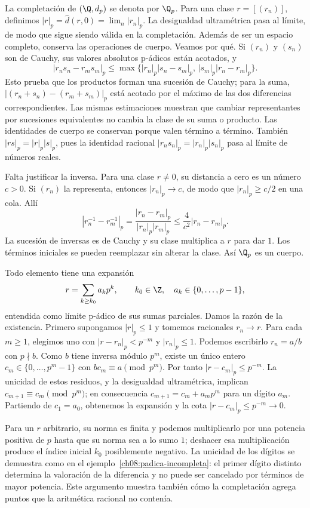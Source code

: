 \begin{ejemplo}\label{ch09:qp}
La completación de $(\Q,d_p)$ se denota por $\Q_p$. Para una clase $r=[(r_n)]$, definimos $|r|_p=\widehat d(r,0)=\lim_n|r_n|_p$. La desigualdad ultramétrica pasa al límite, de modo que sigue siendo válida en la completación. Además de ser un espacio completo, conserva las operaciones de cuerpo. Veamos por qué. Si $(r_n)$ y $(s_n)$ son de Cauchy, sus valores absolutos p-ádicos están acotados, y
\[
 |r_ns_n-r_ms_m|_p\leq
 \max\{|r_n|_p|s_n-s_m|_p,\,|s_m|_p|r_n-r_m|_p\}.
\]
Esto prueba que los productos forman una sucesión de Cauchy; para la suma, $|(r_n+s_n)-(r_m+s_m)|_p$ está acotado por el máximo de las dos diferencias correspondientes. Las mismas estimaciones muestran que cambiar representantes por sucesiones equivalentes no cambia la clase de su suma o producto. Las identidades de cuerpo se conservan porque valen término a término. También $|rs|_p=|r|_p|s|_p$, pues la identidad racional $|r_ns_n|_p=|r_n|_p|s_n|_p$ pasa al límite de números reales.

Falta justificar la inversa. Para una clase $r\ne0$, su distancia a cero es un número $c>0$. Si $(r_n)$ la representa, entonces $|r_n|_p\to c$, de modo que $|r_n|_p\geq c/2$ en una cola. Allí
\[
 |r_n^{-1}-r_m^{-1}|_p
 =\frac{|r_n-r_m|_p}{|r_n|_p|r_m|_p}
 \leq \frac{4}{c^2}|r_n-r_m|_p.
\]
La sucesión de inversas es de Cauchy y su clase multiplica a $r$ para dar $1$. Los términos iniciales se pueden reemplazar sin alterar la clase. Así $\Q_p$ es un cuerpo.

Todo elemento tiene una expansión
\[
 r=\sum_{k\geq k_0}a_kp^k,
 \qquad k_0\in\Z,\quad a_k\in\{0,\ldots,p-1\},
\]
entendida como límite p-ádico de sus sumas parciales. Damos la razón de la existencia. Primero supongamos $|r|_p\leq1$ y tomemos racionales $r_n\to r$. Para cada $m\geq1$, elegimos uno con $|r-r_n|_p<p^{-m}$ y $|r_n|_p\leq1$. Podemos escribirlo $r_n=a/b$ con $p\nmid b$. Como $b$ tiene inversa módulo $p^m$, existe un único entero $c_m\in\{0,\ldots,p^m-1\}$ con $bc_m\equiv a\pmod{p^m}$. Por tanto $|r-c_m|_p\leq p^{-m}$. La unicidad de estos residuos, y la desigualdad ultramétrica, implican $c_{m+1}\equiv c_m\pmod{p^m}$; en consecuencia $c_{m+1}=c_m+a_mp^m$ para un dígito $a_m$. Partiendo de $c_1=a_0$, obtenemos la expansión y la cota $|r-c_m|_p\leq p^{-m}\to0$.

Para un $r$ arbitrario, su norma es finita y podemos multiplicarlo por una potencia positiva de $p$ hasta que su norma sea a lo sumo $1$; deshacer esa multiplicación produce el índice inicial $k_0$ posiblemente negativo. La unicidad de los dígitos se demuestra como en el ejemplo~\ref{ch08:padica-incompleta}: el primer dígito distinto determina la valoración de la diferencia y no puede ser cancelado por términos de mayor potencia. Este argumento muestra también cómo la completación agrega puntos que la aritmética racional no contenía.
\end{ejemplo}

